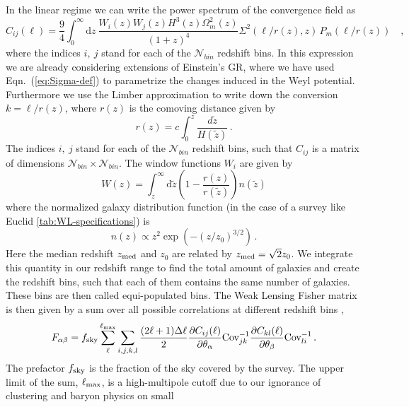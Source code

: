 In the linear regime we can write the power spectrum of the convergence field as
\begin{equation}
\label{def_shear}
C_{ij}(\ell)=\frac{9}{4}\int_{0}^{\infty}\mbox{d}z\:\frac{W_{i}(z)W_{j}(z)H^{3}(z)
	\Omega_{m}^{2}(z)}{(1+z)^{4}}\Sigma^2(\ell/r(z),z) \, P_{m}(\ell/r(z)) \quad ,
\end{equation}
where the indices $i,\:j$ stand for each of the $\mathcal{N}_{bin}$
redshift bins.
In this expression we are already considering extensions of Einstein's GR, 
where we have used Eqn.\ (\ref{eq:Sigma-def}) to parametrize the changes induced in the Weyl potential.
Furthermore we use the Limber approximation to write down the conversion $k=\ell/r(z)$, where $r(z)$ is the comoving
distance given by
\begin{equation}
r(z) = c\int_0^z \frac{d\tilde{z}}{H(\tilde{z})} \, .
\end{equation}
The indices $i,\:j$ stand for each of the $\mathcal{N}_{bin}$
redshift bins, such that $C_{ij}$ is a matrix of dimensions $\mathcal{N}_{bin}\times\mathcal{N}_{bin}$. The window functions $W_i$ are given by
\begin{equation}
W(z)=\int_{z}^{\infty}\mbox{d}\tilde{z}\left(1-\frac{r(z)}{r(\tilde{z})}\right)n(\tilde{z})
\end{equation}
where the normalized galaxy distribution function (in the case of a survey like Euclid \ref{tab:WL-specifications}) is
\begin{equation}
n(z)\propto z^{2}\exp\left(-(z/z_{0})^{3/2}\right) \, . \label{eq:ngal dist}
\end{equation}
Here the median redshift $z_{\rm med}$ and $z_{0}$ are related by $z_{\rm med}=\sqrt{2}z_{0}$.
We integrate this quantity in our redshift range to find the total amount of galaxies and
create the redshift bins, such that each of them contains the same number of galaxies. These bins
are then called equi-populated bins.
The Weak Lensing Fisher matrix is then 
given by a sum over all possible correlations at different redshift bins
\citep{tegmark_measuring_1998},
\begin{equation}
F_{\alpha\beta}=f_{\rm sky}\sum_{\ell}^{\ell_{\mathrm{max}}}\sum_{i,j,k,l}\frac{(2\ell+1)\Delta\ell}{2}\frac{\partial
C_{ij}(\ell)}{\partial\theta_{\alpha}}\textrm{Cov}_{jk}^{-1}\frac{\partial
C_{kl}(\ell)}{\partial\theta_{\beta}}\textrm{Cov}_{li}^{-1} \, . \label{eq:FisherSum-WL}
\end{equation}
The prefactor $f_{\rm sky}$ is the fraction of the sky covered by the survey. The upper limit of the sum, $\ell_{\mathrm{max}}$, is a high-multipole cutoff due to our ignorance of clustering and baryon physics on small
